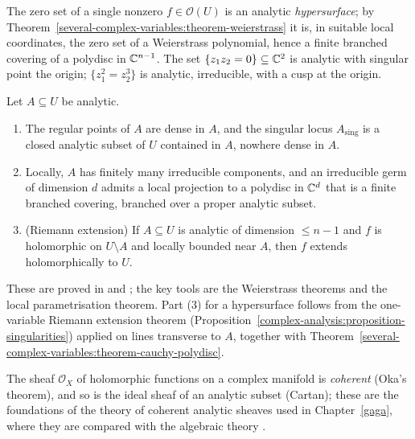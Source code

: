 \begin{example}\label{several-complex-variables:example-analytic-sets}
The zero set of a single nonzero $f \in \mathcal{O}(U)$ is an analytic \emph{hypersurface}; by Theorem~\ref{several-complex-variables:theorem-weierstrass} it is, in suitable local coordinates, the zero set
of a Weierstrass polynomial, hence a finite branched covering of a polydisc in $\mathbb{C}^{n-1}$. The set $\{z_1z_2 = 0\} \subseteq \mathbb{C}^2$ is analytic with singular point the origin; $\{z_1^2 = z_2^3\}$ is analytic,
irreducible, with a cusp at the origin.
\end{example}

\begin{theorem}\label{several-complex-variables:theorem-analytic-structure}
Let $A \subseteq U$ be analytic.
\begin{enumerate}
\item The regular points of $A$ are dense in $A$, and the singular locus $A_{\mathrm{sing}}$ is a closed analytic subset of $U$ contained in $A$, nowhere dense in $A$.
\item Locally, $A$ has finitely many irreducible components, and an irreducible germ of dimension $d$ admits a local projection to a polydisc in $\mathbb{C}^d$ that is a finite branched covering, branched over a
proper analytic subset.
\item (Riemann extension) If $A \subseteq U$ is analytic of dimension $\leq n - 1$ and $f$ is holomorphic on $U \setminus A$ and locally bounded near $A$, then $f$ extends holomorphically to $U$.
\end{enumerate}
\end{theorem}

These are proved in \cite[Chapters II--III]{gunning-rossi} and \cite[Chapters 1--6]{grauert-remmert}; the key tools are the Weierstrass theorems and the local parametrisation theorem. Part (3) for a
hypersurface follows from the one-variable Riemann extension theorem (Proposition~\ref{complex-analysis:proposition-singularities}) applied on lines transverse to $A$, together with
Theorem~\ref{several-complex-variables:theorem-cauchy-polydisc}.

\begin{remark}\label{several-complex-variables:remark-coherence}
The sheaf $\mathcal{O}_X$ of holomorphic functions on a complex manifold is \emph{coherent} (Oka's theorem), and so is the ideal sheaf of an analytic subset (Cartan); these are the foundations of the theory
of coherent analytic sheaves used in Chapter~\ref{gaga}, where they are compared with the algebraic theory \cite{grauert-remmert}.
\end{remark}


